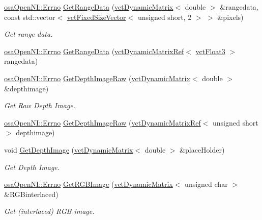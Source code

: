 \begin{DoxyCompactItemize}
\hyperlink{classosa_open_n_i_a9f02bd17e25b1ee362b08c5620e307db}{osa\+Open\+N\+I\+::\+Errno} \hyperlink{classosa_open_n_i_ac67e70112f985be0efb4dda6896d9390}{Get\+Range\+Data} (\hyperlink{classvct_dynamic_matrix}{vct\+Dynamic\+Matrix}$<$ double $>$ \&rangedata, const std\+::vector$<$ \hyperlink{classvct_fixed_size_vector}{vct\+Fixed\+Size\+Vector}$<$ unsigned short, 2 $>$ $>$ \&pixels)
\begin{DoxyCompactList}\small\item\em Get range data. \end{DoxyCompactList}\item 
\hyperlink{classosa_open_n_i_a9f02bd17e25b1ee362b08c5620e307db}{osa\+Open\+N\+I\+::\+Errno} \hyperlink{classosa_open_n_i_aa2cb47bba5e702d4fcae67d953d39038}{Get\+Range\+Data} (\hyperlink{classvct_dynamic_matrix_ref}{vct\+Dynamic\+Matrix\+Ref}$<$ \hyperlink{vct_fixed_size_vector_types_8h_a86116f095b661a1ffb5f630c06ee258d}{vct\+Float3} $>$ rangedata)
\item 
\hyperlink{classosa_open_n_i_a9f02bd17e25b1ee362b08c5620e307db}{osa\+Open\+N\+I\+::\+Errno} \hyperlink{classosa_open_n_i_a0579a51988077caa18d42b25f11dc2d6}{Get\+Depth\+Image\+Raw} (\hyperlink{classvct_dynamic_matrix}{vct\+Dynamic\+Matrix}$<$ double $>$ \&depthimage)
\begin{DoxyCompactList}\small\item\em Get Raw Depth Image. \end{DoxyCompactList}\item 
\hyperlink{classosa_open_n_i_a9f02bd17e25b1ee362b08c5620e307db}{osa\+Open\+N\+I\+::\+Errno} \hyperlink{classosa_open_n_i_a36243cc48387638c3ed79defde032508}{Get\+Depth\+Image\+Raw} (\hyperlink{classvct_dynamic_matrix_ref}{vct\+Dynamic\+Matrix\+Ref}$<$ unsigned short $>$ depthimage)
\item 
void \hyperlink{classosa_open_n_i_a72d3c7f988902ebc0923214938cc8a88}{Get\+Depth\+Image} (\hyperlink{classvct_dynamic_matrix}{vct\+Dynamic\+Matrix}$<$ double $>$ \&place\+Holder)
\begin{DoxyCompactList}\small\item\em Get Depth Image. \end{DoxyCompactList}\item 
\hyperlink{classosa_open_n_i_a9f02bd17e25b1ee362b08c5620e307db}{osa\+Open\+N\+I\+::\+Errno} \hyperlink{classosa_open_n_i_aef356d793e6451703d8e133d30291691}{Get\+R\+G\+B\+Image} (\hyperlink{classvct_dynamic_matrix}{vct\+Dynamic\+Matrix}$<$ unsigned char $>$ \&R\+G\+Binterlaced)
\begin{DoxyCompactList}\small\item\em Get (interlaced) R\+G\+B image. \end{DoxyCompactList}\item 

\end{DoxyCompactItemize}
